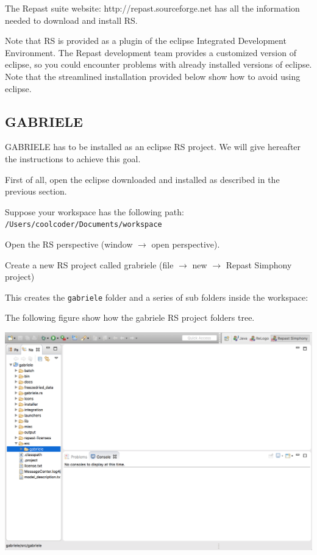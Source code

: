 \documentclass{book}
\begin{document}
The Repast suite website: http://repast.sourceforge.net has all the information needed to download and install RS.

Note that RS is provided as a plugin of the eclipse Integrated Development Environment. The Repast development team provides a customized version of eclipse, so you could encounter problems with already installed versions of eclipse. Note that the streamlined installation provided below show how to avoid using eclipse.

\subsection{GABRIELE}

GABRIELE has to be installed as an eclipse RS project. We will give hereafter the instructions to achieve this goal.

First of all, open the eclipse downloaded and installed as described in the previous section.

Suppose your workspace has the following path:\\
\verb+/Users/coolcoder/Documents/workspace+

Open the RS perspective (window $\rightarrow$ open perspective).

Create a new RS project called grabriele (file $\rightarrow$ new $\rightarrow$ Repast Simphony project)

This creates the \verb+gabriele+ folder and a series of sub folders inside the workspace:

The following figure show how the gabriele RS project folders tree.

\noindent
\includegraphics[scale=0.35]{fig_gabriele_rs_navigation}
\end{document}
